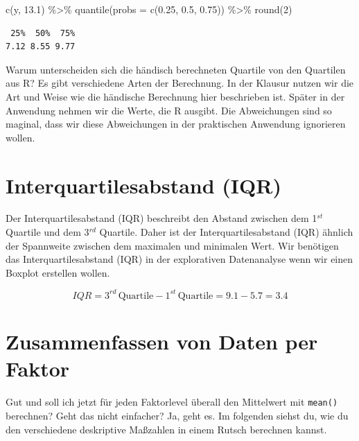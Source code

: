 \documentclass[
  letterpaper,
]{scrbook}
\newenvironment{Shaded}{\begin{snugshade}}{\end{snugshade}}
\newcommand{\AttributeTok}[1]{\textcolor[rgb]{0.40,0.45,0.13}{#1}}
\newcommand{\DecValTok}[1]{\textcolor[rgb]{0.68,0.00,0.00}{#1}}
\newcommand{\FloatTok}[1]{\textcolor[rgb]{0.68,0.00,0.00}{#1}}
\newcommand{\FunctionTok}[1]{\textcolor[rgb]{0.28,0.35,0.67}{#1}}
\newcommand{\NormalTok}[1]{\textcolor[rgb]{0.00,0.23,0.31}{#1}}
\newcommand{\SpecialCharTok}[1]{\textcolor[rgb]{0.37,0.37,0.37}{#1}}
\begin{document}
\begin{Shaded}
\begin{Highlighting}[]
\FunctionTok{c}\NormalTok{(y, }\FloatTok{13.1}\NormalTok{) }\SpecialCharTok{\%\textgreater{}\%} \FunctionTok{quantile}\NormalTok{(}\AttributeTok{probs =} \FunctionTok{c}\NormalTok{(}\FloatTok{0.25}\NormalTok{, }\FloatTok{0.5}\NormalTok{, }\FloatTok{0.75}\NormalTok{)) }\SpecialCharTok{\%\textgreater{}\%} \FunctionTok{round}\NormalTok{(}\DecValTok{2}\NormalTok{) }
\end{Highlighting}
\end{Shaded}

\begin{verbatim}
 25%  50%  75% 
7.12 8.55 9.77 
\end{verbatim}

Warum unterscheiden sich die händisch berechneten Quartile von den
Quartilen aus R? Es gibt verschiedene Arten der Berechnung. In der
Klausur nutzen wir die Art und Weise wie die händische Berechnung hier
beschrieben ist. Später in der Anwendung nehmen wir die Werte, die R
ausgibt. Die Abweichungen sind so maginal, dass wir diese Abweichungen
in der praktischen Anwendung ignorieren wollen.

\hypertarget{interquartilesabstand-iqr}{%
\section{Interquartilesabstand (IQR)}\label{interquartilesabstand-iqr}}

Der Interquartilesabstand (IQR) beschreibt den Abstand zwischen dem
1\(^{st}\) Quartile und dem 3\(^{rd}\) Quartile. Daher ist der
Interquartilesabstand (IQR) ähnlich der Spannweite zwischen dem
maximalen und minimalen Wert. Wir benötigen das Interquartilesabstand
(IQR) in der explorativen Datenanalyse wenn wir einen Boxplot erstellen
wollen.

\[
IQR = 3^{rd}\,\mbox{Quartile} - 1^{st}\,\mbox{Quartile} = 9.1 - 5.7 = 3.4
\]

\hypertarget{sec-desc-group-by}{%
\section{Zusammenfassen von Daten per Faktor}\label{sec-desc-group-by}}

Gut und soll ich jetzt für jeden Faktorlevel überall den Mittelwert mit
\texttt{mean()} berechnen? Geht das nicht einfacher? Ja, geht es. Im
folgenden siehst du, wie du den verschiedene deskriptive Maßzahlen in
einem Rutsch berechnen kannst.
\end{document}
